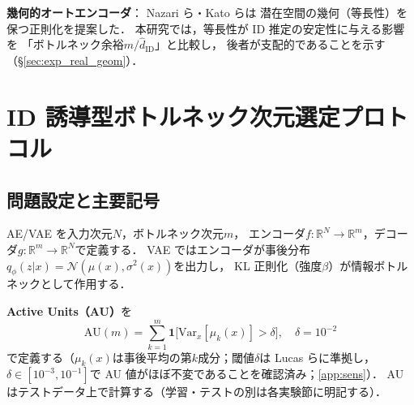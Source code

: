 \documentclass[11pt,a4paper]{jsarticle}
\newcommand{\hatdID}{\hat{d}_{\mathrm{ID}}}
\newcommand{\R}{\mathbb{R}}
\begin{document}
\textbf{幾何的オートエンコーダ}：
Nazari ら\cite{nazari2023geometric}・Kato ら\cite{kato2020rdae}は
潜在空間の幾何（等長性）を保つ正則化を提案した．
本研究では，等長性が ID 推定の安定性に与える影響を
「ボトルネック余裕$m / \hatdID$」と比較し，
後者が支配的であることを示す（§\ref{sec:exp_real_geom}）．

\section{ID 誘導型ボトルネック次元選定プロトコル}\label{sec:protocol}

\subsection{問題設定と主要記号}\label{sec:protocol_setup}

AE/VAE を入力次元$N$，ボトルネック次元$m$，
エンコーダ$f: \R^N \to \R^m$，デコーダ$g: \R^m \to \R^N$で定義する．
VAE ではエンコーダが事後分布$q_\phi(z|x) = \mathcal{N}(\mu(x), \sigma^2(x))$を出力し，
KL 正則化（強度$\beta$）が情報ボトルネックとして作用する．

\textbf{Active Units（AU）}を
\begin{equation}
  \mathrm{AU}(m) = \sum_{k=1}^{m} \mathbf{1}\bigl[\mathrm{Var}_x[\mu_k(x)] > \delta\bigr],
  \quad \delta = 10^{-2}
  \label{eq:au_def}
\end{equation}
で定義する（$\mu_k(x)$は事後平均の第$k$成分；閾値$\delta$は
Lucas ら\cite{lucas2019elbo}に準拠し，$\delta \in [10^{-3}, 10^{-1}]$で
AU 値がほぼ不変であることを確認済み；\ref{app:sens}）．
AU はテストデータ上で計算する（学習・テストの別は各実験節に明記する）．
\end{document}
